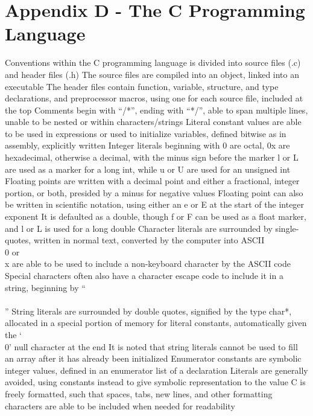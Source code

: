 \documentclass[11 pt, twoside]{article}
\newenvironment{outline*}
{
	\begin{outline}[enumerate]
	}
	{\end{outline}
}
\begin{document}
\section{Appendix D - The C Programming Language}
\begin{outline*}
\1 Conventions within the C programming language is divided into source files (.c) and header files (.h)
\2 The source files are compiled into an object, linked into an executable
\2 The header files contain function, variable, structure, and type declarations, and preprocessor macros, using one for each source file, included at the top
\2 Comments begin with ``/*'', ending with ``*/'', able to span multiple lines, unable to be nested or within characters/strings
\2 Literal constant values are able to be used in expressions or used to initialize variables, defined bitwise as in assembly, explicitly written
\3 Integer literals beginning with 0 are octal, 0x are hexadecimal, otherwise a decimal, with the minus sign before the marker
\4 l or L are used as a marker for a long int, while u or U are used for an unsigned int
\3 Floating points are written with a decimal point and either a fractional, integer portion, or both, presided by a minus for negative values
\4 Floating point can also be written in scientific notation, using either an e or E at the start of the integer exponent
\4 It is defaulted as a double, though f or F can be used as a float marker, and l or L is used for a long double
\3 Character literals are surrounded by single-quotes, written in normal text, converted by the computer into ASCII
\4 \\0 or \\x are able to be used to include a non-keyboard character by the ASCII code
\4 Special characters often also have a character escape code to include it in a string, beginning by ``\\\\''
\3 String literals are surrounded by double quotes, signified by the type char*, allocated in a special portion of memory for literal constants, automatically given the `\\0' null character at the end
\4 It is noted that string literals cannot be used to fill an array after it has already been initialized
\3 Enumerator constants are symbolic integer values, defined in an enumerator list of a declaration
\3 Literals are generally avoided, using constants instead to give symbolic representation to the value
\2 C is freely formatted, such that spaces, tabs, new lines, and other formatting characters are able to be included when needed for readability

\end{outline*}
\end{document}
